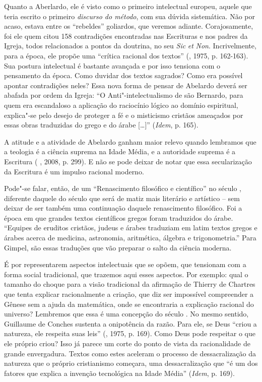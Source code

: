 Quanto a Aberlardo, ele é visto como o primeiro intelectual europeu,
aquele que teria escrito o primeiro \emph{discurso do método}, com sua
dúvida sistemática. Não por acaso, estava entre os ``rebeldes''
goliardos, que veremos adiante. Corajosamente, foi ele quem citou 158
contradições encontradas nas Escrituras e nos padres da Igreja, todos
relacionados a pontos da doutrina, no seu \emph{Sic} \emph{et}
\emph{Non}. Incrivelmente, para a época, ele propõe uma ``crítica
racional dos textos'' (, 1975, p. 162-163). Sua postura
intelectual é bastante avançada e por isso tensiona com o pensamento da
época. Como duvidar dos textos sagrados? Como era possível apontar
contradições neles? Essa nova forma de pensar de Abelardo deverá ser
abafada por ordem da Igreja: ``O Anti"-intelectualismo de são Bernardo,
para quem era escandaloso a aplicação do raciocínio lógico ao domínio
espiritual, explica"-se pelo desejo de proteger a fé e o misticismo
cristãos ameaçados por essas obras traduzidas do grego e do árabe
[\ldots{}]'' (\emph{Idem}, p. 165).

A atitude e a atividade de Abelardo ganham maior relevo quando lembramos
que a teologia é a ciência suprema na Idade Média, e a autoridade
suprema é a Escritura ( , 2008, p. 299). E não se pode deixar de
notar que essa secularização da Escritura é um impulso racional moderno.

Pode"-se falar, então, de um ``Renascimento filosófico e científico'' no
século , diferente daquele do século  que será de matiz mais
literário e artístico -- sem deixar de ser também uma continuação
daquele renascimento filosófico. Foi a época em que grandes textos
científicos gregos foram traduzidos do árabe. ``Equipes de eruditos
cristãos, judeus e árabes traduziam em latim textos gregos e árabes
acerca de medicina, astronomia, aritmética, álgebra e trigonometria.''
Para Gimpel, são essas traduções que vão preparar o salto da ciência
moderna.

É por representarem aspectos intelectuais que se opõem, que tensionam
com a forma social tradicional, que trazemos aqui esses aspectos. Por
exemplo: qual o tamanho do choque para a visão tradicional da afirmação
de Thierry de Chartres que tenta explicar racionalmente a criação, que
diz ser impossível compreender a Gênese sem a ajuda da matemática, onde
se encontraria a explicação racional do universo? Lembremos que essa é
uma concepção do século . No mesmo sentido, Guillaume de Conches
sustenta a onipotência da razão. Para ele, se Deus ``criou a
natureza, ele respeita suas leis'' (, 1975, p. 169). Como Deus
pode respeitar o que ele próprio criou? Isso já parece um corte do ponto
de vista da racionalidade de grande envergadura. Textos como estes
aceleram o processo de dessacralização da natureza que o próprio
cristianismo começara, uma dessacralização que ``é um dos fatores que
explica a invenção tecnológica na Idade Média'' (\emph{Idem}, p. 169).

